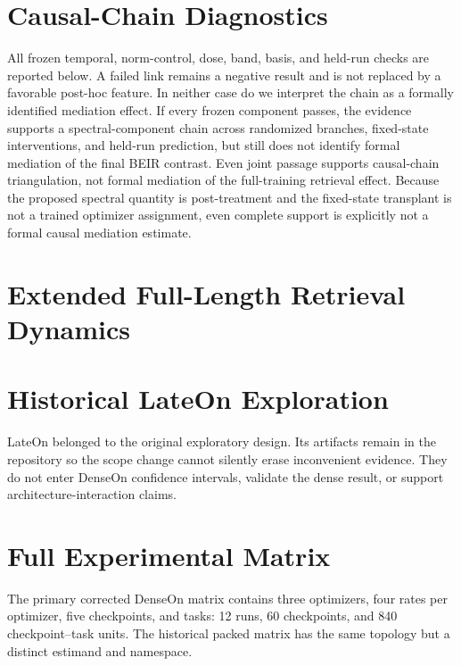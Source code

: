 \documentclass[11pt]{article}
\begin{document}


\RepresentationHeadline



\section{Causal-Chain Diagnostics}
\label{sec:causal-chain-diagnostics}

All frozen temporal, norm-control, dose, band, basis, and held-run checks are reported below. A
failed link remains a negative result and is not replaced by a favorable post-hoc feature.
In neither case do we interpret the chain as a formally identified mediation effect. If every
frozen component passes, the evidence supports a spectral-component chain across randomized
branches, fixed-state interventions, and held-run prediction, but still does not identify formal
mediation of the final BEIR contrast. Even joint passage supports causal-chain triangulation, not
formal mediation of the full-training retrieval effect. Because the proposed spectral quantity is
post-treatment and the fixed-state transplant is not a trained optimizer assignment, even complete
support is explicitly not a formal causal mediation estimate.

\CausalChainDiagnostics

\section{Extended Full-Length Retrieval Dynamics}



\section{Historical LateOn Exploration}

LateOn belonged to the original exploratory design. Its artifacts remain in the repository so the
scope change cannot silently erase inconvenient evidence. They do not enter DenseOn confidence
intervals, validate the dense result, or support architecture-interaction claims.

\section{Full Experimental Matrix}

The primary corrected DenseOn matrix contains three optimizers, four rates per optimizer, five
checkpoints, and \NumBEIRTasks{} tasks: 12 runs, 60 checkpoints, and 840 checkpoint--task units.
The historical packed matrix has the same topology but a distinct estimand and namespace.


\end{document}
